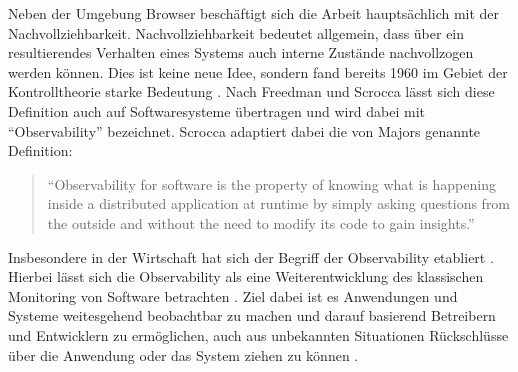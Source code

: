 Neben der Umgebung Browser beschäftigt sich die Arbeit hauptsächlich mit der Nachvollziehbarkeit. Nachvollziehbarkeit bedeutet allgemein, dass über ein resultierendes Verhalten eines Systems auch interne Zustände nachvollzogen werden können. Dies ist keine neue Idee, sondern fand bereits 1960 im Gebiet der Kontrolltheorie starke Bedeutung \cite{OnTheGeneralTheoryOfControlSystems}. Nach Freedman \cite{TestabilityOfSoftwareComponents} und Scrocca \etal \cite{TheKaijuProjectPaper} lässt sich diese Definition auch auf Softwaresysteme übertragen und wird dabei mit \enquote{Observability} bezeichnet. Scrocca adaptiert dabei die von Majors \cite{MajorsObservability} genannte Definition:

\begin{quotation}
\enquote{Observability for software is the property of knowing what is happening inside a distributed application at runtime by simply asking questions from the outside and without the need to modify its code to gain insights.}
\end{quotation}

Insbesondere in der Wirtschaft hat sich der Begriff der Observability etabliert \cite{DynatraceObservability} \cite{NewRelicObservability}. Hierbei lässt sich die Observability als eine Weiterentwicklung des klassischen Monitoring von Software betrachten \cite{TheNewStackMonitoringAndObservability}. Ziel dabei ist es Anwendungen und Systeme weitesgehend beobachtbar zu machen und darauf basierend Betreibern und Entwicklern zu ermöglichen, auch aus unbekannten Situationen Rückschlüsse über die Anwendung oder das System ziehen zu können \cite{MichaelGrafBA}.

%
%
%

